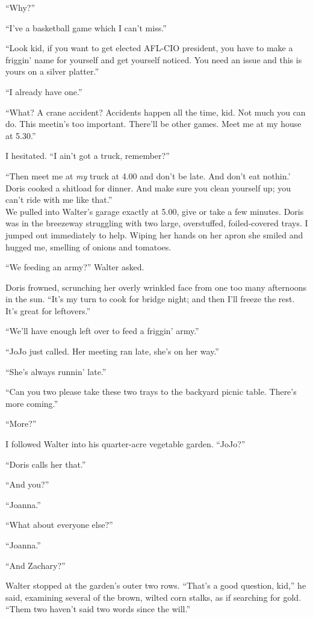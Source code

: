 ``Why?''

``I've a basketball game which I can't miss.''

``Look kid, if you want to get elected AFL-CIO president, you have to
make a friggin' name for yourself and get yourself noticed. You need an
issue and this is yours on a silver platter.''

``I already have one.''

``What? A crane accident? Accidents happen all the time, kid. Not much
you can do. This meetin's too important. There'll be other games. Meet
me at my house at 5.30.''

I hesitated. ``I ain't got a truck, remember?''

``Then meet me at \emph{my} truck at 4.00 and don't be late. And don't
eat nothin.' Doris cooked a shitload for dinner. And make sure you clean
yourself up; you can't ride with me like that.''\\

We pulled into Walter's garage exactly at 5.00, give or take a few
minutes. Doris was in the breezeway struggling with two large,
overstuffed, foiled-covered trays. I jumped out immediately to help.
Wiping her hands on her apron she smiled and hugged me, smelling of
onions and tomatoes.

``We feeding an army?'' Walter asked.

Doris frowned, scrunching her overly wrinkled face from one too many
afternoons in the sun. ``It's my turn to cook for bridge night; and then
I'll freeze the rest. It's great for leftovers.''

``We'll have enough left over to feed a friggin' army.''

``JoJo just called. Her meeting ran late, she's on her way.''

``She's always runnin' late.''

``Can you two please take these two trays to the backyard picnic table.
There's more coming.''

``More?''

I followed Walter into his quarter-acre vegetable garden. ``JoJo?''

``Doris calls her that.''

``And you?''

``Joanna.''

``What about everyone else?''

``Joanna.''

``And Zachary?''

Walter stopped at the garden's outer two rows. ``That's a good question,
kid,'' he said, examining several of the brown, wilted corn stalks, as
if searching for gold. ``Them two haven't said two words since the
will.''

